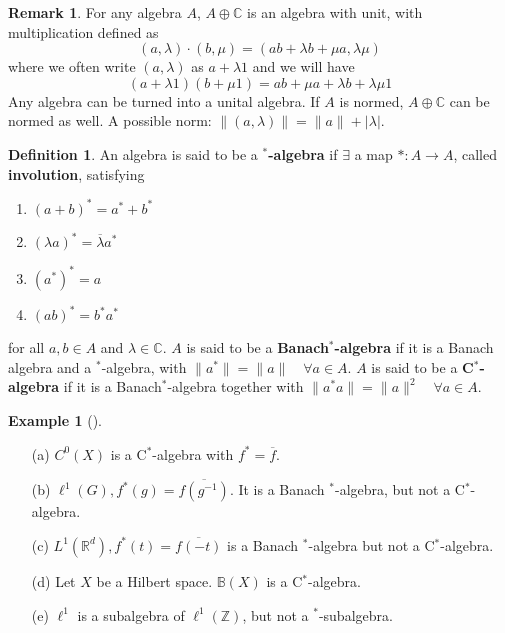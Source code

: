 \documentclass{article}
\theoremstyle{definition}
\newtheorem{ex}{Example}
\newtheorem{dfn}{Definition}
\newtheorem{rem}{Remark}
\newenvironment{exs}[1][]{%
  \begin{ex}[#1]$ $\par\nobreak\ignorespaces
}{%
  \end{ex}
}
\newcommand{\BB}{\mathbb B}
\newcommand{\CC}{\mathbb C}
\newcommand{\RR}{\mathbb R}
\newcommand{\ZZ}{\mathbb Z}
\begin{document}
\begin{rem}
	For any algebra $A$, $A \oplus \CC$ is an algebra with unit, with multiplication defined as
	\[
		(a, \lambda) \cdot (b, \mu) = (ab + \lambda b + \mu a, \lambda \mu)
	\]
	where we often write $(a, \lambda)$ as $a + \lambda 1$ and we will have
	\[
		(a + \lambda 1)(b + \mu 1) = ab + \mu a + \lambda b + \lambda \mu 1
	\]
	Any algebra can be turned into a unital algebra.
	If $A$ is normed, $A \oplus \CC$ can be normed as well.
	A possible norm: $\|(a, \lambda)\| = \|a\| + |\lambda|$.
\end{rem}

\begin{dfn}
	An algebra is said to be a $\bm{^*}$\textbf{-algebra} if $\exists$ a map $*: A \to A$, called \textbf{involution}, satisfying
	\begin{enumerate}
		\item $(a + b)^* = a^* + b^*$

		\item $(\lambda a)^* = \overline{\lambda} a^*$

		\item $(a^*)^* = a$

		\item $(ab)^* = b^* a^*$
	\end{enumerate}
	for all $a, b \in A$ and $\lambda \in \CC$.
	$A$ is said to be a \textbf{Banach$\bm{^*}$-algebra} if it is a Banach algebra and a $^*$-algebra, with $\|a^*\| = \|a\| \quad \forall a \in A$.
	$A$ is said to be a \textbf{C$\bm{^*}$-algebra} if it is a Banach$^*$-algebra together with $\|a^* a\| = \|a\|^2 \quad \forall a \in A$.
\end{dfn}

\begin{exs}
	\begin{enumerate}
		\item[(a)] $C^0(X)$ is a C$^*$-algebra with $f^* = \overline{f}$.

		\item[(b)] $\ell^1(G), f^*(g) = \overline{f(g^{-1})}$.
			It is a Banach $^*$-algebra, but not a C$^*$-algebra.

		\item[(c)] $L^1(\RR^d), f^*(t) = \overline{f(-t)}$ is a Banach $^*$-algebra but not a C$^*$-algebra.

		\item[(d)] Let $X$ be a Hilbert space.
			$\BB(X)$ is a C$^*$-algebra.

		\item[(e)] $\ell^1$ is a subalgebra of $\ell^1(\ZZ)$, but not a $^*$-subalgebra.
	\end{enumerate}
\end{exs}	
\end{document}
